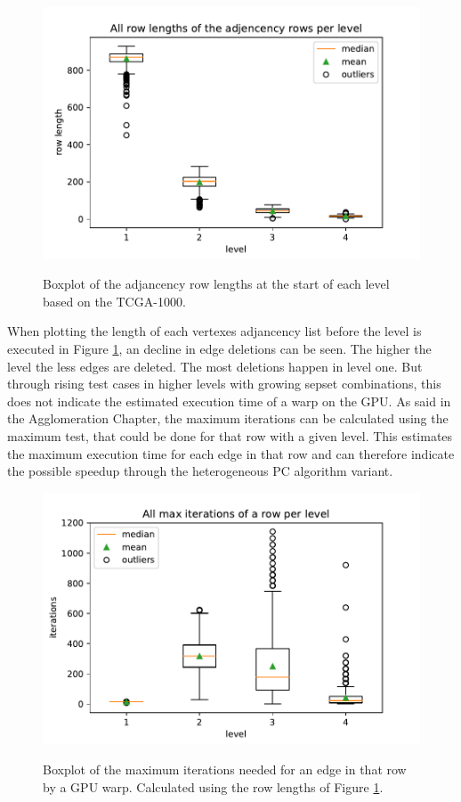 \begin{figure}[H]
  \caption{Boxplot of the adjancency row lengths at the start of each level based on the TCGA-1000.}
  \includegraphics[width=\textwidth]{figures/rowlength_bxplt.pdf}
  \centering
  \label{fig:rowlength_bxplt}
\end{figure}

When plotting the length of each vertexes adjancency list before the level is executed in Figure \ref{fig:rowlength_bxplt}, an decline in edge deletions can be seen. The higher the level the less edges are deleted. The most deletions happen in level one. But through rising test cases in higher levels with growing sepset combinations, this does not indicate the estimated execution time of a warp on the GPU. As said in the Agglomeration Chapter, the maximum iterations can be calculated using the maximum test, that could be done for that row with a given level. This estimates the maximum execution time for each edge in that row and can therefore indicate the possible speedup through the heterogeneous PC algorithm variant.

\begin{figure}[H]
  \caption{Boxplot of the maximum iterations needed for an edge in that row by a GPU warp. Calculated using the row lengths of Figure \ref{fig:rowlength_bxplt}.}
  \includegraphics[width=\textwidth]{figures/iterations_bxplt.pdf}
  \centering
  \label{fig:iterations_bxplt}
\end{figure}

